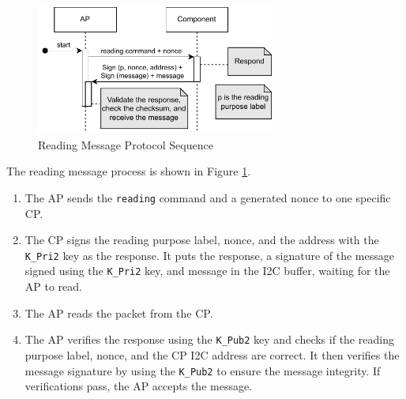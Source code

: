 \documentclass[11pt,oneside,onecolumn,letterpaper]{article}
\begin{document}
	\begin{figure}[h]
		\centering
		\includegraphics[width=0.7\textwidth]{pics/post2.pdf}
		\caption{Reading Message Protocol Sequence}
		\label{fig:functionality_post2}
	\end{figure}
	
	The reading message process is shown in Figure \ref{fig:functionality_post2}.
	\begin{enumerate}
		\item The AP sends the \texttt{reading} command and a generated nonce to one specific CP.
		\item The CP signs the reading purpose label,
		nonce,
		and the address with the \texttt{K\_Pri2} key as the response.
		It puts the response,
		a signature of the message signed using the \texttt{K\_Pri2} key,
		and message in the I2C buffer,
		waiting for the AP to read.
		\item The AP reads the packet from the CP.
		\item The AP verifies the response using the \texttt{K\_Pub2} key and checks if the reading purpose label,
		nonce,
		and the CP I2C address are correct.
		It then verifies the message signature by using the \texttt{K\_Pub2} to ensure the message integrity.
		If verifications pass,
		the AP accepts the message.
	\end{enumerate}
	
\end{document}
